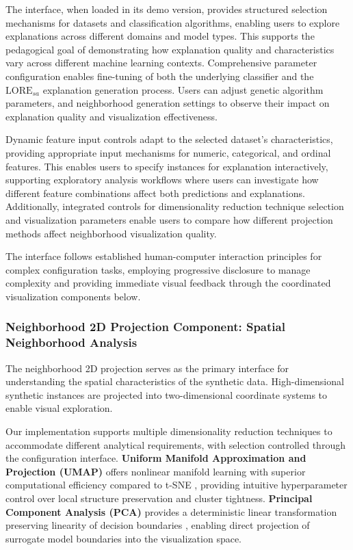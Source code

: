 The interface, when loaded in its demo version, provides structured selection mechanisms for datasets and classification algorithms, enabling users to explore explanations across different domains and model types. This supports the pedagogical goal of demonstrating how explanation quality and characteristics vary across different machine learning contexts.
%
Comprehensive parameter configuration enables fine-tuning of both the underlying classifier and the $\text{LORE}_{sa}$ explanation generation process. Users can adjust genetic algorithm parameters, and neighborhood generation settings to observe their impact on explanation quality and visualization effectiveness.

Dynamic feature input controls adapt to the selected dataset's characteristics, providing appropriate input mechanisms for numeric, categorical, and ordinal features. This enables users to specify instances for explanation interactively, supporting exploratory analysis workflows where users can investigate how different feature combinations affect both predictions and explanations.
% 
Additionally, integrated controls for dimensionality reduction technique selection and visualization parameters enable users to compare how different projection methods affect neighborhood visualization quality.

The interface follows established human-computer interaction principles for complex configuration tasks, employing progressive disclosure to manage complexity and providing immediate visual feedback through the coordinated visualization components below.

\subsubsection{Neighborhood 2D Projection Component: Spatial Neighborhood Analysis}

The neighborhood 2D projection serves as the primary interface for understanding the spatial characteristics of the synthetic data. High-dimensional synthetic instances are projected into two-dimensional coordinate systems to enable visual exploration.

Our implementation supports multiple dimensionality reduction techniques to accommodate different analytical requirements, with selection controlled through the configuration interface. \textbf{Uniform Manifold Approximation and Projection (UMAP)} offers nonlinear manifold learning with superior computational efficiency compared to t-SNE \cite{mcinnes2020umapuniformmanifoldapproximation,yang2021dimensionality}, providing intuitive hyperparameter control over local structure preservation and cluster tightness. \textbf{Principal Component Analysis (PCA)} provides a deterministic linear transformation preserving linearity of decision boundaries \cite{sewell2008pca}, enabling direct projection of surrogate model boundaries into the visualization space. 

